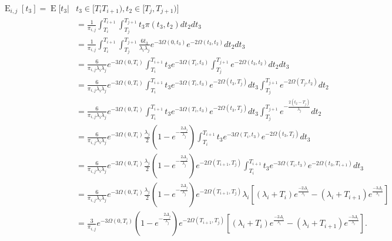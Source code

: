 \documentclass{article}
\DeclareMathOperator{\E}{E}
\begin{document}
\begin{align}
    \begin{split}
        \E_{i,j}[t_3] = \E\big[t_3|&t_3 \in [T_i T_{i+1}),t_2 \in [T_j,T_{j+1}) \big]\\
        &= \frac{1}{\pi_{i,j}}\int_{T_i}^{T_{i+1}}\int_{T_j}^{T_{j+1}}t_3\pi(t_3,t_2)dt_2dt_3\\
        &= \frac{1}{\pi_{i,j}}\int_{T_i}^{T_{i+1}}\int_{T_j}^{T_{j+1}}
            \frac{6t_3}{\lambda_i \lambda_j}e^{-3\Omega(0,t_3)}e^{-2\Omega(t_3,t_2)}dt_2dt_3\\
        &=\frac{6}{\pi_{i,j}\lambda_i\lambda_j}e^{-3\Omega(0,T_i)}
            \int_{T_i}^{T_{i+1}}t_3e^{-3\Omega(T_i,t_3)}\int_{T_j}^{T_{j+1}}e^{-2\Omega(t_3,t_2)}dt_2dt_3\\
        &=\frac{6}{\pi_{i,j}\lambda_i\lambda_j}e^{-3\Omega(0,T_i)}
            \int_{T_i}^{T_{i+1}}t_3e^{-3\Omega(T_i,t_3)}e^{-2\Omega(t_3,T_j)}dt_3\int_{T_j}^{T_{j+1}}e^{-2\Omega(T_j,t_2)}dt_2\\
        &=\frac{6}{\pi_{i,j}\lambda_i\lambda_j}e^{-3\Omega(0,T_i)}
            \int_{T_i}^{T_{i+1}}t_3e^{-3\Omega(T_i,t_3)}e^{-2\Omega(t_3,T_j)}dt_3\int_{T_j}^{T_{j+1}}e^{-\frac{2(t_2-T_j)}{\lambda_j}}dt_2\\
        &=\frac{6}{\pi_{i,j}\lambda_i\lambda_j}e^{-3\Omega(0,T_i)}\frac{\lambda_j}{2}\left(1-e^{-\frac{2\Delta_j}{\lambda_j}}\right)
            \int_{T_i}^{T_{i+1}}t_3e^{-3\Omega(T_i,t_3)}e^{-2\Omega(t_3,T_j)}dt_3\\
        &=\frac{6}{\pi_{i,j}\lambda_i\lambda_j}e^{-3\Omega(0,T_i)}
            \frac{\lambda_j}{2}\left(1-e^{-\frac{2\Delta_j}{\lambda_j}}\right)e^{-2\Omega(T_{i+1},T_j)}
            \int_{T_i}^{T_{i+1}}t_3e^{-3\Omega(T_i,t_3)}e^{-2\Omega(t_3,T_{i+1})}dt_3\\
        &=\frac{6}{\pi_{i,j}\lambda_i\lambda_j}e^{-3\Omega(0,T_i)}
            \frac{\lambda_j}{2}\left(1-e^{-\frac{2\Delta_j}{\lambda_j}}\right)e^{-2\Omega(T_{i+1},T_j)}
            \lambda_i\left[(\lambda_i+T_i)e^{\frac{-2\Delta_i}{\lambda_i}}-(\lambda_i+T_{i+1})e^{\frac{-3\Delta_i}{\lambda_i}}\right]\\
        &=\frac{3}{\pi_{i,j}}e^{-3\Omega(0,T_i)}
            \left(1-e^{-\frac{2\Delta_j}{\lambda_j}}\right)e^{-2\Omega(T_{i+1},T_j)}
            \left[(\lambda_i+T_i)e^{\frac{-2\Delta_i}{\lambda_i}}-(\lambda_i+T_{i+1})e^{\frac{-3\Delta_i}{\lambda_i}}\right].\\
    \end{split}
    \label{eq:Et3}
\end{align}
\end{document}
